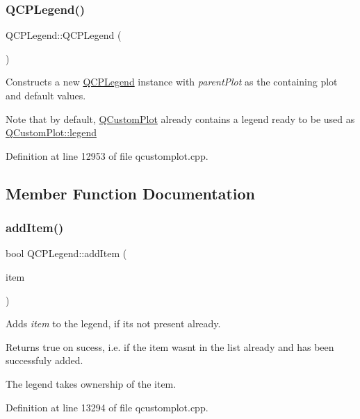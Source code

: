 \subsubsection{\texorpdfstring{Q\+C\+P\+Legend()}{QCPLegend()}}
{\footnotesize\ttfamily Q\+C\+P\+Legend\+::\+Q\+C\+P\+Legend (\begin{DoxyParamCaption}{ }\end{DoxyParamCaption})\hspace{0.3cm}{\ttfamily [explicit]}}

Constructs a new \hyperlink{class_q_c_p_legend}{Q\+C\+P\+Legend} instance with {\itshape parent\+Plot} as the containing plot and default values.

Note that by default, \hyperlink{class_q_custom_plot}{Q\+Custom\+Plot} already contains a legend ready to be used as \hyperlink{class_q_custom_plot_a4eadcd237dc6a09938b68b16877fa6af}{Q\+Custom\+Plot\+::legend} 

Definition at line 12953 of file qcustomplot.\+cpp.



\subsection{Member Function Documentation}
\mbox{\label{class_q_c_p_legend_a3ab274de52d2951faea45a6d975e6b3f}} 
\subsubsection{\texorpdfstring{add\+Item()}{addItem()}}
{\footnotesize\ttfamily bool Q\+C\+P\+Legend\+::add\+Item (\begin{DoxyParamCaption}\item[{\hyperlink{class_q_c_p_abstract_legend_item}{Q\+C\+P\+Abstract\+Legend\+Item} $\ast$}]{item }\end{DoxyParamCaption})}

Adds {\itshape item} to the legend, if it\textquotesingle{}s not present already.

Returns true on sucess, i.\+e. if the item wasn\textquotesingle{}t in the list already and has been successfuly added.

The legend takes ownership of the item. 

Definition at line 13294 of file qcustomplot.\+cpp.

